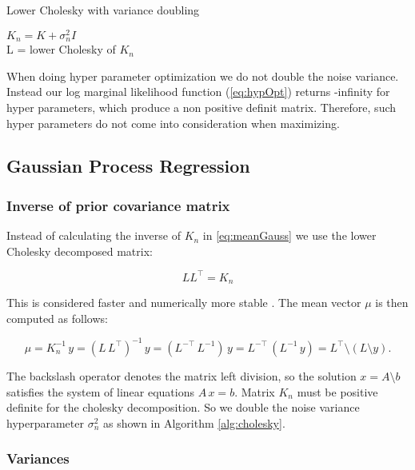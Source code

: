 \begin{algorithm}
    \caption{Lower Cholesky with variance doubling\label{alg:cholesky}}
    \BlankLine
    $K_n = K+\sigma_n^2 I$\\
    L = lower Cholesky of $K_n$\\
\end{algorithm}

When doing hyper parameter optimization we do not double the noise variance. Instead our log marginal likelihood function (\ref{eq:hypOpt}) returns -infinity for hyper parameters, which produce a non positive definit matrix. Therefore, such hyper parameters do not come into consideration when maximizing.

\subsection{Gaussian Process Regression}

\subsubsection{Inverse of prior covariance matrix}

Instead of calculating the inverse of $K_n$ in \eqref{eq:meanGauss} we use the lower Cholesky decomposed matrix:

$$LL^\top=K_n$$

This is considered faster and numerically more stable \cite{rasmussen2006gaussian}. The mean vector $\mu$ is then computed as follows:

\begin{equation} \label{eq:regression}
    \mu = K_n^{-1}\,y = (L\,L^{\top})^{-1}\,y = (L^{-\top}\,L^{-1})\,y = L^{-\top}\,(L^{-1}\,y) = L^{\top}\setminus(L \setminus y).
\end{equation}

The backslash operator denotes the matrix left division, so the solution $x=A\setminus b$ satisfies the system of linear equations $A\,x=b$.
Matrix $K_n$ must be positive definite for the cholesky decomposition. So we double the noise variance hyperparameter $\sigma_n^2$ as shown in Algorithm \ref{alg:cholesky}.

\subsubsection{Variances}

